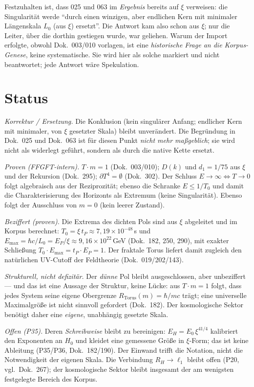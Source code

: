Festzuhalten ist, dass 025 und 063 im \emph{Ergebnis} bereits auf $\xi$ verweisen: die
Singularität werde \enquote{durch einen winzigen, aber endlichen Kern mit minimaler Längenskala
$L_0$ (aus $\xi$) ersetzt}. Die Antwort kam also schon aus $\xi$; nur die Leiter, über die
dorthin gestiegen wurde, war geliehen. Warum der Import erfolgte, obwohl Dok.~003/010 vorlagen,
ist eine \emph{historische Frage an die Korpus-Genese}, keine systematische. Sie wird hier als
solche markiert und nicht beantwortet; jede Antwort wäre Spekulation.

\section{Status}

\emph{Korrektur / Ersetzung.} Die Konklusion (kein singulärer Anfang; endlicher Kern mit
minimaler, von $\xi$ gesetzter Skala) bleibt unverändert. Die Begründung in Dok.~025 und Dok.~063
ist für diesen Punkt \emph{nicht mehr maßgeblich}; sie wird nicht als widerlegt geführt, sondern
als durch die native Kette ersetzt.

\emph{Proven (FFGFT-intern).} $T\cdot m = 1$ (Dok.~003/010); $D(k)$ und $d_1 = 1/75$ aus $\xi$
und der Rekursion (Dok.~295); $\partial T^4 = \emptyset$ (Dok.~302). Der Schluss $E\to\infty
\Leftrightarrow T\to 0$ folgt algebraisch aus der Reziprozität; ebenso die Schranke $E\le 1/T_0$
und damit die Charakterisierung des Horizonts als Extremum (keine Singularität). Ebenso folgt der Ausschluss von $m=0$ (kein leerer Zustand).

\emph{Beziffert (proven).} Die Extrema des dichten Pols sind aus $\xi$ abgeleitet und im Korpus
berechnet: $T_0 = \xi\,t_P \approx 7{,}19\times10^{-48}$\,s und $E_\text{max} = \hbar c/L_0 = E_P/\xi
\approx 9{,}16\times10^{22}$\,GeV (Dok.~182, 250, 290), mit exakter Schließung
$T_0\cdot E_\text{max} = t_P\cdot E_P = 1$. Der fraktale Torus liefert damit zugleich den
natürlichen UV-Cutoff der Feldtheorie (Dok.~019/202/143).

\emph{Strukturell, nicht defizitär.} Der \emph{dünne} Pol bleibt ausgeschlossen, aber
unbeziffert --- und das ist eine Aussage der Struktur, keine Lücke: aus $T\cdot m = 1$ folgt, dass
jedes System seine eigene Obergrenze $R_\text{Torus}(m) = \hbar/mc$ trägt; eine universelle
Maximalgröße ist nicht sinnvoll gefordert (Dok.~182). Der kosmologische Sektor benötigt daher eine
\emph{eigene}, unabhängig gesetzte Skala.

\emph{Offen (P35).} Deren \emph{Schreibweise} bleibt zu bereinigen: $E_H = E_0\,\xi^{41/4}$
kalibriert den Exponenten an $H_0$ und kleidet eine gemessene Größe in $\xi$-Form; das ist keine
Ableitung (P35/P36, Dok.~182/190). Der Einwand trifft die Notation, nicht die Notwendigkeit der
eigenen Skala. Die Verbindung $R_H \to \ell_1$ bleibt offen (P20, vgl.\
Dok.~267); der kosmologische Sektor bleibt insgesamt der am wenigsten festgelegte Bereich des
Korpus.
